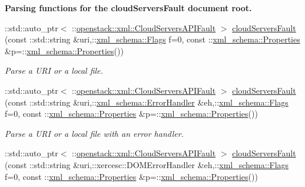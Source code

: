 \begin{Indent}{\bf Parsing functions for the cloudServersFault document root.}\par
\begin{DoxyCompactItemize}
\item 
::std::auto\_\-ptr$<$ ::\hyperlink{classopenstack_1_1xml_1_1CloudServersAPIFault}{openstack::xml::CloudServersAPIFault} $>$ \hyperlink{namespaceopenstack_1_1xml_adb50ba79ff22f80a3251acf0407939ff}{cloudServersFault} (const ::std::string \&uri,::\hyperlink{namespacexml__schema_affb4c227cbd9aa7453dd1dc5a1401943}{xml\_\-schema::Flags} f=0, const ::\hyperlink{namespacexml__schema_ad27ce19a7ee1d3b1064092648898f64c}{xml\_\-schema::Properties} \&p=::\hyperlink{namespacexml__schema_ad27ce19a7ee1d3b1064092648898f64c}{xml\_\-schema::Properties}())
\begin{DoxyCompactList}\small\item\em Parse a URI or a local file. \item\end{DoxyCompactList}\item 
::std::auto\_\-ptr$<$ ::\hyperlink{classopenstack_1_1xml_1_1CloudServersAPIFault}{openstack::xml::CloudServersAPIFault} $>$ \hyperlink{namespaceopenstack_1_1xml_aa3fb9e3af4ce0dced6241936588bd18b}{cloudServersFault} (const ::std::string \&uri,::\hyperlink{namespacexml__schema_ab1c9361bfd3b404eaabf0c31eded79dc}{xml\_\-schema::ErrorHandler} \&eh,::\hyperlink{namespacexml__schema_affb4c227cbd9aa7453dd1dc5a1401943}{xml\_\-schema::Flags} f=0, const ::\hyperlink{namespacexml__schema_ad27ce19a7ee1d3b1064092648898f64c}{xml\_\-schema::Properties} \&p=::\hyperlink{namespacexml__schema_ad27ce19a7ee1d3b1064092648898f64c}{xml\_\-schema::Properties}())
\begin{DoxyCompactList}\small\item\em Parse a URI or a local file with an error handler. \item\end{DoxyCompactList}\item 
::std::auto\_\-ptr$<$ ::\hyperlink{classopenstack_1_1xml_1_1CloudServersAPIFault}{openstack::xml::CloudServersAPIFault} $>$ \hyperlink{namespaceopenstack_1_1xml_ac53a2875870c839d06fce0aee8f29f12}{cloudServersFault} (const ::std::string \&uri,::xercesc::DOMErrorHandler \&eh,::\hyperlink{namespacexml__schema_affb4c227cbd9aa7453dd1dc5a1401943}{xml\_\-schema::Flags} f=0, const ::\hyperlink{namespacexml__schema_ad27ce19a7ee1d3b1064092648898f64c}{xml\_\-schema::Properties} \&p=::\hyperlink{namespacexml__schema_ad27ce19a7ee1d3b1064092648898f64c}{xml\_\-schema::Properties}())

\end{DoxyCompactItemize}
\end{Indent}
